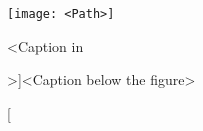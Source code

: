\usepackage{graphicx}

\begin{figure}[h]																	%
	\centering																		%
	\texttt{[image: <Path>]}									%
	\caption[<Caption in \listoffigures>]{<Caption below the figure>\footnotemark} 	%
	\label{fig:<Lable name>}														%
\end{figure}
